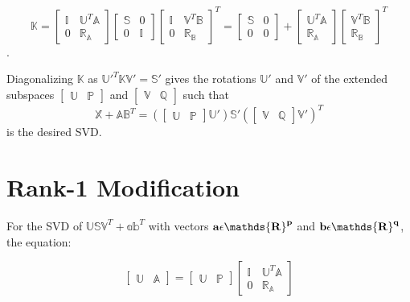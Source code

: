 \documentclass{article}
\begin{document}
$$
\mathds{K}=
\begin{bmatrix}
\mathds{I} & \mathds{U}^T\mathds{A}\\
0 & \mathds{R_A}
\end{bmatrix}
\begin{bmatrix}
\mathds{S} & 0\\
0 & \mathds{I}
\end{bmatrix}
\begin{bmatrix}
\mathds{I} & \mathds{V}^T\mathds{B}\\
0 & \mathds{R_B}
\end{bmatrix}^T
=
\begin{bmatrix}
\mathds{S} & 0\\
0 & 0
\end{bmatrix}
+
\begin{bmatrix}
\mathds{U}^T\mathds{A}\\
\mathds{R_A}
\end{bmatrix}
\begin{bmatrix}
\mathds{V}^T\mathds{B}\\
\mathds{R_B}
\end{bmatrix}^T
$$.

Diagonalizing $\mathds{K}$ as $\mathds{U}'^T\mathds{KV}'=\mathds{S}'$ gives the rotations $\mathds{U}'$ and $\mathds{V}'$ of the extended subspaces
$
\begin{bmatrix}
\mathds{U} & \mathds{P}
\end{bmatrix}
$
and
$
\begin{bmatrix}
\mathds{V} & \mathds{Q}
\end{bmatrix}
$
such that
$$
\mathds{X}+\mathds{AB}^T = \left(
\begin{bmatrix}
\mathds{U} & \mathds{P}
\end{bmatrix}
\mathds{U}' \right)
\mathds{S}'\left(
\begin{bmatrix}
\mathds{V} & \mathds{Q}
\end{bmatrix}
\mathds{V}'\right)^T
$$
is the desired SVD.


\section{Rank-1 Modification\label{rank}}
For the SVD of $\mathds{USV}^T + \mathds{ab}^T$ with vectors $\bf{a}\epsilon\mathds{R}^p$ and $\bf{b}\epsilon\mathds{R}^q$, the equation:

$$
\begin{bmatrix}
\mathds{U} & \mathds{A}
\end{bmatrix}
=
\begin{bmatrix}
\mathds{U} & \mathds{P}
\end{bmatrix}
\begin{bmatrix}
\mathds{I} & \mathds{U}^T\mathds{A} \\
0 & \mathds{R_A}
\end{bmatrix}
$$
\end{document}
